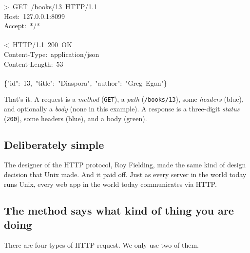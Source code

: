 \documentclass[11pt,a4paper]{article}
\begin{document}
\begin{center}
\colorbox{codebg}{\begin{minipage}{0.95\linewidth}\ttfamily\small
\setlength{\fboxsep}{1.5pt}\vspace{1mm}
\mbox{> GET /books/13 \colorbox{linebg}{HTTP/1.1}}\\
\hspace*{1em}\colorbox{hdrbg}{\mbox{Host: 127.0.0.1:8099}}\\
\hspace*{1em}\colorbox{hdrbg}{\mbox{Accept: */*}}\\
\mbox{}\\
\mbox{< \colorbox{linebg}{HTTP/1.1} 200 OK}\\
\hspace*{1em}\colorbox{hdrbg}{\mbox{Content-Type: application/json}}\\
\hspace*{1em}\colorbox{hdrbg}{\mbox{Content-Length: 53}}\\
\mbox{}\\
\hspace*{1em}\colorbox{bdybg}{\mbox{\{"id": 13, "title": "Diaspora", "author": "Greg Egan"\}}}
\vspace{1mm}
\end{minipage}}
\end{center}

That's it. A request is a \emph{method} (\texttt{GET}), a \emph{path} (\texttt{/books/13}), some
\emph{headers} (blue), and optionally a \emph{body} (none in this example). A response is a
three-digit \emph{status} (\texttt{200}), some headers (blue), and a body (green).

\subsection{Deliberately simple}

The designer of the HTTP protocol, Roy Fielding, made the same kind of design decision that Unix
made. And it paid off. Just as every server in the world today runs Unix, every web app in the
world today communicates via HTTP.

\newpage

\subsection{The method says what kind of thing you are doing}

There are four types of HTTP request. We only use two of them.
\end{document}
